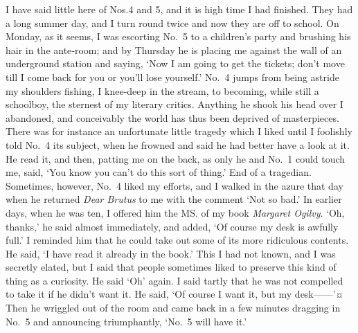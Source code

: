 I have said little here of Nos.\@ 4 and 5, and it is high time I had finished.
They had a long summer day, and I turn round twice and now they are off to school.
On Monday, as it seems,
I was escorting No.~5 to a children’s party and brushing his hair in the ante‐room;
and by Thursday he is placing me against the wall of an underground station and saying,
‘Now I am going to get the tickets;
don’t move till I come back for you or you’ll lose yourself.’
No.~4 jumps from being astride my shoulders fishing, I knee‐deep in the stream,
to becoming, while still a schoolboy, the sternest of my literary critics.
Anything he shook his head over I abandoned,
and conceivably the world has thus been deprived of masterpieces.
There was for instance an unfortunate little tragedy which I liked
until I foolishly told No.~4 its subject,
when he frowned and said he had better have a look at it.
He read it, and then, patting me on the back, as only he and No.~1 could touch me, said,
‘You know you can’t do this sort of thing.’
End of a tragedian.
Sometimes, however, No.~4 liked my efforts,
and I walked in the azure that day when he returned \emph{Dear Brutus} to me
with the comment ‘Not so bad.’
In earlier days, when he was ten, I offered him the MS. of my book \emph{Margaret Ogilvy}.
‘Oh, thanks,’ he said almost immediately, and added, ‘Of course my desk is awfully full.’
I reminded him that he could take out some of its more ridiculous contents.
He said, ‘I have read it already in the book.’
This I had not known, and I was secretly elated,
but I said that people sometimes liked to preserve this kind of thing as a curiosity.
He said ‘Oh’ again.
I said tartly that he was not compelled to take it if he didn’t want it.
He said, ‘Of course I want it, but my desk——’¤
Then he wriggled out of the room and came back in a few minutes
dragging in No.~5 and announcing triumphantly, ‘No.~5 will have it.’

